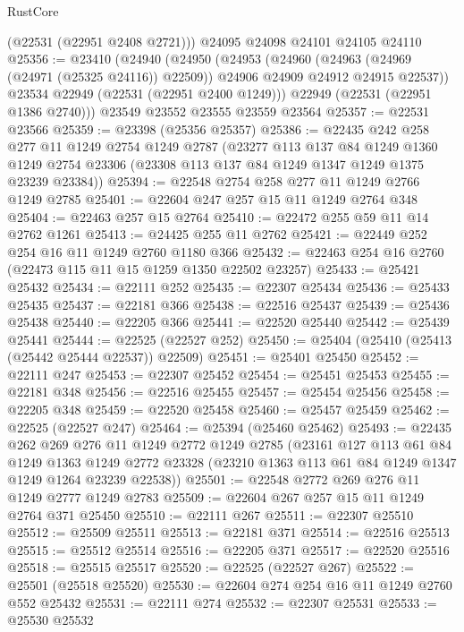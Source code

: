 \begin{lexlean}{RustCore}
\begin{coremodule}
      (@22531 (@22951 @2408 @2721)))
    @24095
    @24098
    @24101
    @24105
    @24110
@25356 := @23410
    (@24940
      (@24950
        (@24953
          (@24960
            (@24963 (@24969 (@24971 (@25325 @24116)) @22509))
            @24906
            @24909
            @24912
            @24915
            @22537))
        @23534
        @22949
        (@22531 (@22951 @2400 @1249)))
      @22949
      (@22531 (@22951 @1386 @2740)))
    @23549
    @23552
    @23555
    @23559
    @23564
@25357 := @22531 @23566
@25359 := @23398 (@25356 @25357)
@25386 := @22435
    @242
    @258
    @277
    @11
    @1249
    @2754
    @1249
    @2787
    (@23277
      @113
      @137
      @84
      @1249
      @1360
      @1249
      @2754
      @23306
      (@23308 @113 @137 @84 @1249 @1347 @1249 @1375 @23239 @23384))
@25394 := @22548 @2754 @258 @277 @11 @1249 @2766 @1249 @2785
@25401 := @22604 @247 @257 @15 @11 @1249 @2764 @348
@25404 := @22463 @257 @15 @2764
@25410 := @22472 @255 @59 @11 @14 @2762 @1261
@25413 := @24425 @255 @11 @2762
@25421 := @22449 @252 @254 @16 @11 @1249 @2760 @1180 @366
@25432 := @22463 @254 @16 @2760 (@22473 @115 @11 @15 @1259 @1350 @22502 @23257)
@25433 := @25421 @25432
@25434 := @22111 @252
@25435 := @22307 @25434
@25436 := @25433 @25435
@25437 := @22181 @366
@25438 := @22516 @25437
@25439 := @25436 @25438
@25440 := @22205 @366
@25441 := @22520 @25440
@25442 := @25439 @25441
@25444 := @22525 (@22527 @252)
@25450 := @25404 (@25410 (@25413 (@25442 @25444 @22537)) @22509)
@25451 := @25401 @25450
@25452 := @22111 @247
@25453 := @22307 @25452
@25454 := @25451 @25453
@25455 := @22181 @348
@25456 := @22516 @25455
@25457 := @25454 @25456
@25458 := @22205 @348
@25459 := @22520 @25458
@25460 := @25457 @25459
@25462 := @22525 (@22527 @247)
@25464 := @25394 (@25460 @25462)
@25493 := @22435
    @262
    @269
    @276
    @11
    @1249
    @2772
    @1249
    @2785
    (@23161
      @127
      @113
      @61
      @84
      @1249
      @1363
      @1249
      @2772
      @23328
      (@23210 @1363 @113 @61 @84 @1249 @1347 @1249 @1264 @23239 @22538))
@25501 := @22548 @2772 @269 @276 @11 @1249 @2777 @1249 @2783
@25509 := @22604 @267 @257 @15 @11 @1249 @2764 @371 @25450
@25510 := @22111 @267
@25511 := @22307 @25510
@25512 := @25509 @25511
@25513 := @22181 @371
@25514 := @22516 @25513
@25515 := @25512 @25514
@25516 := @22205 @371
@25517 := @22520 @25516
@25518 := @25515 @25517
@25520 := @22525 (@22527 @267)
@25522 := @25501 (@25518 @25520)
@25530 := @22604 @274 @254 @16 @11 @1249 @2760 @552 @25432
@25531 := @22111 @274
@25532 := @22307 @25531
@25533 := @25530 @25532

\end{coremodule}
\end{lexlean}
